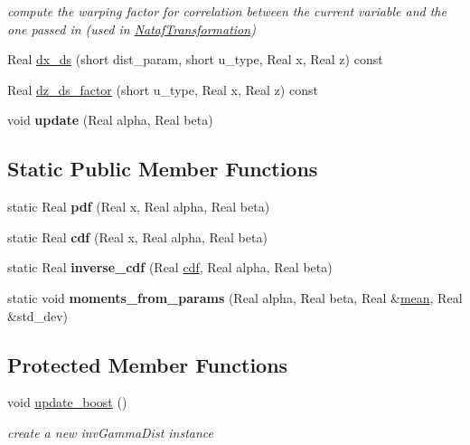 \begin{DoxyCompactItemize}
\begin{DoxyCompactList}\small\item\em compute the warping factor for correlation between the current variable and the one passed in (used in \hyperlink{classPecos_1_1NatafTransformation}{Nataf\+Transformation}) \end{DoxyCompactList}\item 
Real \hyperlink{classPecos_1_1InvGammaRandomVariable_af889af8adfb262c9b74f573b2a9ffc99}{dx\+\_\+ds} (short dist\+\_\+param, short u\+\_\+type, Real x, Real z) const 
\item 
Real \hyperlink{classPecos_1_1InvGammaRandomVariable_af6b5fc528523180bed5fc3008dcea205}{dz\+\_\+ds\+\_\+factor} (short u\+\_\+type, Real x, Real z) const 
\item 
void {\bfseries update} (Real alpha, Real beta)\label{classPecos_1_1InvGammaRandomVariable_aaa82eccfdca4d440a4e2d4a890b0d9ed}

\end{DoxyCompactItemize}
\subsection*{Static Public Member Functions}
\begin{DoxyCompactItemize}
\item 
static Real {\bfseries pdf} (Real x, Real alpha, Real beta)\label{classPecos_1_1InvGammaRandomVariable_a739d94cef9ee188f00056e229ca3fd95}

\item 
static Real {\bfseries cdf} (Real x, Real alpha, Real beta)\label{classPecos_1_1InvGammaRandomVariable_a6ccc276bca2bfdfd6f320c65a6c8aaf7}

\item 
static Real {\bfseries inverse\+\_\+cdf} (Real \hyperlink{classPecos_1_1InvGammaRandomVariable_addd564e7f4f314e12d38df74d845f0d8}{cdf}, Real alpha, Real beta)\label{classPecos_1_1InvGammaRandomVariable_a2e77b37ec653326d8c6189a646b8db7b}

\item 
static void {\bfseries moments\+\_\+from\+\_\+params} (Real alpha, Real beta, Real \&\hyperlink{classPecos_1_1InvGammaRandomVariable_a962ffe5a3593be370d5c883365c060f4}{mean}, Real \&std\+\_\+dev)\label{classPecos_1_1InvGammaRandomVariable_af6459b831a8e62a41f7eab34d06edad8}

\end{DoxyCompactItemize}
\subsection*{Protected Member Functions}
\begin{DoxyCompactItemize}
\item 
void \hyperlink{classPecos_1_1InvGammaRandomVariable_aaa6750cbee2245416a6eeeac58d4405a}{update\+\_\+boost} ()\label{classPecos_1_1InvGammaRandomVariable_aaa6750cbee2245416a6eeeac58d4405a}

\begin{DoxyCompactList}\small\item\em create a new inv\+Gamma\+Dist instance \end{DoxyCompactList}\end{DoxyCompactItemize}
